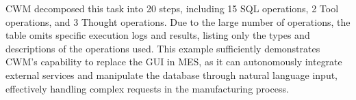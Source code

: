\documentclass[preprint,12pt]{elsarticle}
\begin{document}
CWM decomposed this task into 20 steps, including 15 SQL operations, 2 Tool operations, and 3 Thought operations. 
Due to the large number of operations, the table omits specific execution logs and results, listing only the types and descriptions of the operations used. 
This example sufficiently demonstrates CWM's capability to replace the GUI in MES, as it can autonomously integrate external services and manipulate the database through natural language input, effectively handling complex requests in the manufacturing process.


\end{document}
